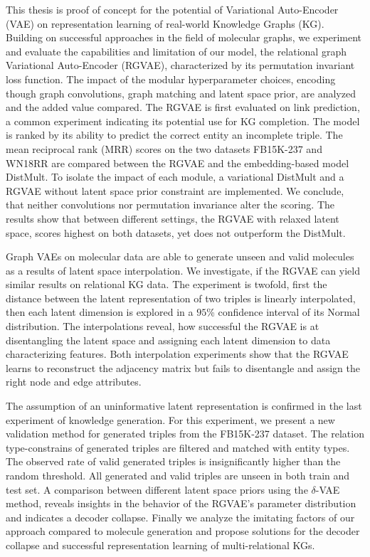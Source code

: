 \documentclass{article}
\makeatletter
\let\oldabstract\abstract
\let\oldendabstract\endabstract
\renewenvironment{abstract}
{\renewenvironment{quotation}%
               {\list{}{\addtolength{\leftmargin}{3em} %
                        \listparindent 1.5em%
                        \itemindent    \listparindent%
                        \rightmargin   \leftmargin%
                        \parsep        \z@ \@plus\p@}%
                \item\relax}%
               {\endlist}%
\oldabstract}
{\oldendabstract}
\makeatother
\begin{document}
\newpage
{}

\begin{abstract}

This thesis is proof of concept for the potential of Variational Auto-Encoder (VAE) on representation learning of real-world Knowledge Graphs (KG). Building on successful approaches in the field of molecular graphs, we experiment and evaluate the capabilities and limitation of our model, the relational graph Variational Auto-Encoder (RGVAE), characterized by its permutation invariant loss function. The impact of the modular hyperparameter choices, encoding though graph convolutions, graph matching and latent space prior, are analyzed and the added value compared. The RGVAE is first evaluated on link prediction, a common experiment indicating its potential use for KG completion. The model is ranked by its ability to predict the correct entity an incomplete triple. The mean reciprocal rank (MRR) scores on the two datasets FB15K-237 and WN18RR are compared between the RGVAE and the embedding-based model DistMult.
To isolate the impact of each module, a variational DistMult and a RGVAE without latent space prior constraint are implemented. We conclude, that neither convolutions nor permutation invariance alter the scoring. The results show that between different settings, the RGVAE with relaxed latent space, scores highest on both datasets, yet does not outperform the DistMult.

Graph VAEs on molecular data are able to generate unseen and valid molecules as a results of latent space interpolation. We investigate, if the RGVAE can yield similar results on relational KG data. The experiment is twofold, first the distance between the latent representation of two triples is linearly interpolated, then each latent dimension is explored in a $95$\% confidence interval of its Normal distribution. The interpolations reveal, how successful the RGVAE is at disentangling the latent space and assigning each latent dimension to data characterizing features. Both interpolation experiments show that the RGVAE learns to reconstruct the adjacency matrix but fails to disentangle and assign the right node and edge attributes. 

The assumption of an uninformative latent representation is confirmed in the last experiment of knowledge generation. For this experiment, we present a new validation method for generated triples from the FB15K-237 dataset. The relation type-constrains of generated triples are filtered and matched with entity types. The observed rate of valid generated triples is insignificantly higher than the random threshold. All generated and valid triples are unseen in both train and test set. A comparison between different latent space priors using the $\delta$-VAE method, reveals insights in the behavior of the RGVAE's parameter distribution and indicates a decoder collapse. Finally we analyze the imitating factors of our approach compared to molecule generation and propose solutions for the decoder collapse and successful representation learning of multi-relational KGs. 
\end{abstract}
\newpage
\end{document}
